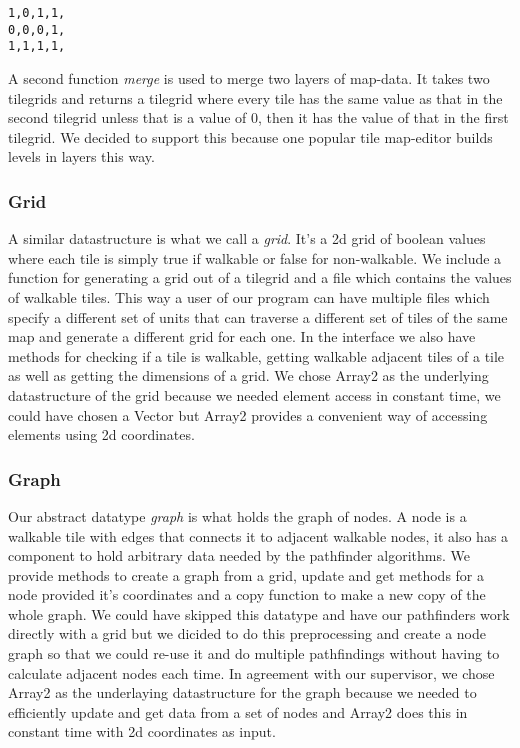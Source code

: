 \documentclass[12pt, a4paper]{article}
\begin{document}
\texttt{1,0,1,1,\\
0,0,0,1,\\
1,1,1,1,\\
}

A second function \textit{merge} is used to merge two layers of map-data. It takes two tilegrids and returns a tilegrid where every tile has the same value as that in the second tilegrid unless that is a value of 0, then it has the value of that in the first tilegrid. We decided to support this because one popular tile map-editor\cite{mapeditor} builds levels in layers this way.

\subsubsection{Grid}

A similar datastructure is what we call a \textit{grid}. It's a 2d grid of boolean values where each tile is simply true if walkable or false for non-walkable. We include a function for generating a grid out of a tilegrid and a file which contains the values of walkable tiles. This way a user of our program can have multiple files which specify a different set of units that can traverse a different set of tiles of the same map and generate a different grid for each one. In the interface we also have methods for checking if a tile is walkable, getting walkable adjacent tiles of a tile as well as getting the dimensions of a grid. We chose Array2 as the underlying datastructure of the grid because we needed element access in constant time, we could have chosen a Vector but Array2 provides a convenient way of accessing elements using 2d coordinates.

\subsubsection{Graph}
Our abstract datatype \textit{graph} is what holds the graph of nodes. A node is a walkable tile with edges that connects it to adjacent walkable nodes, it also has a component to hold arbitrary data needed by the pathfinder algorithms. We provide methods to create a graph from a grid, update and get methods for a node provided it's coordinates and a copy function to make a new copy of the whole graph. We could have skipped this datatype and have our pathfinders work directly with a grid but we dicided to do this preprocessing and create a node graph so that we could re-use it and do multiple pathfindings without having to calculate adjacent nodes each time. In agreement with our supervisor, we chose Array2 as the underlaying datastructure for the graph because we needed to efficiently update and get data from a set of nodes and Array2 does this in constant time with 2d coordinates as input.
\end{document}
